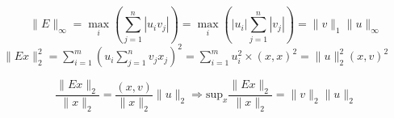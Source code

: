 {\begin{enumerate}
{$$\|E\|_{\infty }= \max_i\left(\sum_{j=1}^n|u_iv_j|\right) =\max_i\left(|u_i|\sum_{j=1}^n|v_j|\right)=\|v\|_1\|u\|_{\infty}$$
$\|Ex\|_2^2=\sum_{i=1}^m\left(u_i\sum_{j=1}^n v_jx_j\right)^2 =\sum_{i=1}^mu_i^2 \times (x,x)^2=\|u\|_2^2 (x,v)^2$

$$\frac{\|Ex\|_2}{\|x\|_2}=\frac{(x,v)}{\|x\|_2} \|u\|_2 \Rightarrow \mbox{sup}_x\frac{\|Ex\|_2}{\|x\|_2}=\|v\|_2\|u\|_2$$}
\end{enumerate}
}
